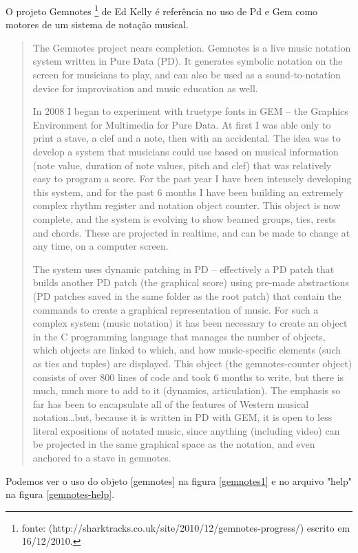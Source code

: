 \documentclass[draft]{ppgmus}
\begin{document}
O projeto Gemnotes \footnote{fonte: (http://sharktracks.co.uk/site/2010/12/gemnotes-progress/) escrito em 16/12/2010.}
de Ed Kelly é referência no uso
de Pd e Gem como motores de um sistema de notação
musical.

\begin{quotation}
 The Gemnotes project nears completion. Gemnotes is a live music notation system written in Pure Data (PD). 
It generates symbolic notation on the screen for musicians to play, and can also be used as a sound-to-notation 
device for improvisation and music education as well.

In 2008 I began to experiment with truetype fonts in GEM – the Graphics Environment for Multimedia for Pure Data. At first I was able only to print a stave, a clef and a note, then with an accidental. The idea was to develop a system that musicians could use based on musical information (note value, duration of note values, pitch and clef) that was relatively easy to program a score. For the past year I have been intensely developing this system, and for the past 6 months I have been building an extremely complex rhythm register and notation object counter. This object is now complete, and the system is evolving to show beamed groups, ties, rests and chords. These are projected in realtime, and can be made to change at any time, on a computer screen.

The system uses dynamic patching in PD – effectively a PD patch that builds another PD patch (the graphical score) 
using pre-made abstractions (PD patches saved in the same folder as the root patch) that contain the commands to 
create a graphical representation of music. For such a complex system (music notation) it has been necessary to 
create an object in the C programming language that manages the number of objects, which objects are linked to which, 
and how music-specific elements (such as ties and tuples) are displayed. This object (the gemnotes-counter object) 
consists of over 800 lines of code and took 6 months to write, but there is much, much more to add to it 
(dynamics, articulation). The emphasis so far has been to encapsulate all of the features of Western musical 
notation…but, because it is written in PD with GEM, it is open to less literal expositions of notated music, 
since anything (including video) can be projected in the same graphical space as the notation, and even anchored 
to a stave in gemnotes.
\end{quotation} 

Podemos ver o uso do objeto [gemnotes] na figura \ref{gemnotes1} e no arquivo "help" na figura \ref{gemnotes-help}.
\end{document}
